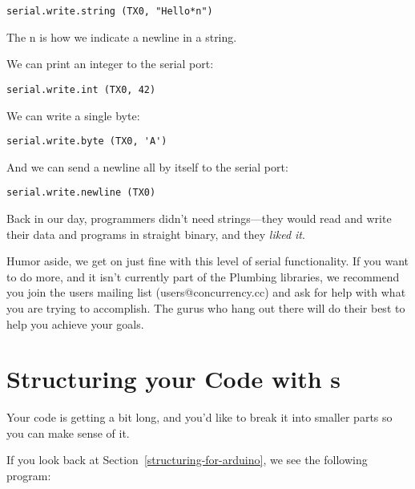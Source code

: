 \begin{lstlisting}
serial.write.string (TX0, "Hello*n")
\end{lstlisting}

The {\code *n} is how we indicate a newline in a string. 

We can print an integer to the serial port:

\begin{lstlisting}
serial.write.int (TX0, 42)
\end{lstlisting}

We can write a single byte:

\begin{lstlisting}
serial.write.byte (TX0, 'A')
\end{lstlisting}

And we can send a newline all by itself to the serial port:

\begin{lstlisting}
serial.write.newline (TX0)
\end{lstlisting}

\discussion
Back in our day, programmers didn't need strings---they would read and write their data and programs in straight binary, and they \emph{liked it}.

Humor aside, we get on just fine with this level of serial functionality. If you want to do more, and it isn't currently part of the Plumbing libraries, we recommend you join the users mailing list ({\code users@concurrency.cc}) and ask for help with what you are trying to accomplish. The \occam gurus who hang out there will do their best to help you achieve your goals.

\makingthingsbreak

\XXX

\seealso

\XXX

% 
\section{Structuring your Code with {\PROC}s}
\problem
Your code is getting a bit long, and you'd like to break it into smaller parts so you can make sense of it.

\solution
If you look back at Section~\vref{structuring-for-arduino}, we see the following program:



